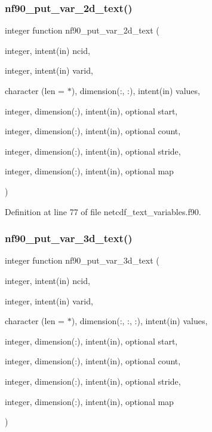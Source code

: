 \subsubsection{\texorpdfstring{nf90\+\_\+put\+\_\+var\+\_\+2d\+\_\+text()}{nf90\_put\_var\_2d\_text()}}
{\footnotesize\ttfamily integer function nf90\+\_\+put\+\_\+var\+\_\+2d\+\_\+text (\begin{DoxyParamCaption}\item[{integer, intent(in)}]{ncid,  }\item[{integer, intent(in)}]{varid,  }\item[{character (len = $\ast$), dimension(\+:, \+:), intent(in)}]{values,  }\item[{integer, dimension(\+:), intent(in), optional}]{start,  }\item[{integer, dimension(\+:), intent(in), optional}]{count,  }\item[{integer, dimension(\+:), intent(in), optional}]{stride,  }\item[{integer, dimension(\+:), intent(in), optional}]{map }\end{DoxyParamCaption})}



Definition at line 77 of file netcdf\+\_\+text\+\_\+variables.\+f90.

\mbox{\label{netcdf__text__variables_8f90_a6b41034b62da58c313e15328cb551488}} 
\subsubsection{\texorpdfstring{nf90\+\_\+put\+\_\+var\+\_\+3d\+\_\+text()}{nf90\_put\_var\_3d\_text()}}
{\footnotesize\ttfamily integer function nf90\+\_\+put\+\_\+var\+\_\+3d\+\_\+text (\begin{DoxyParamCaption}\item[{integer, intent(in)}]{ncid,  }\item[{integer, intent(in)}]{varid,  }\item[{character (len = $\ast$), dimension(\+:, \+:, \+:), intent(in)}]{values,  }\item[{integer, dimension(\+:), intent(in), optional}]{start,  }\item[{integer, dimension(\+:), intent(in), optional}]{count,  }\item[{integer, dimension(\+:), intent(in), optional}]{stride,  }\item[{integer, dimension(\+:), intent(in), optional}]{map }\end{DoxyParamCaption})}




